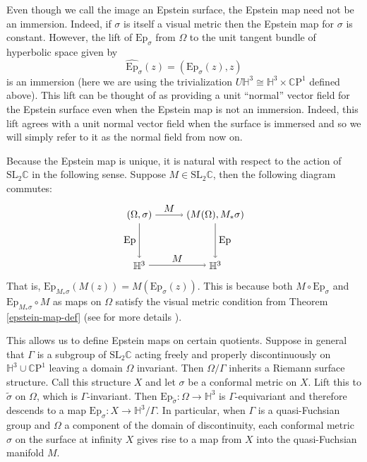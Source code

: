 \documentclass{amsart}
\newcommand{\C}{\mathbb{C}}
\newcommand{\CP}{\mathbb{C}\mathrm{P}}
\renewcommand{\H}{\mathbb{H}}
\begin{document}
 

Even though we call the image an Epstein surface, the Epstein map need not be an immersion. 
Indeed, if $\sigma$ is itself a visual metric then the Epstein map for $\sigma$ is constant. 
However, the lift of $\mathrm{Ep}_\sigma$ from $\Omega$ to the unit tangent bundle of hyperbolic space given by 
\[
\widehat{\mathrm{Ep}}_\sigma(z) = (\text{Ep}_\sigma(z),z) 
\] 
is an immersion (here we are using the trivialization $U\H^3 \cong \H^3 \times \CP^1$ defined above). 
This lift can be thought of as providing a unit ``normal'' vector field for the Epstein surface even when the Epstein map is not an immersion. 
Indeed, this lift agrees with a unit normal vector field when the surface is immersed and so we will simply refer to it as the normal field from now on. 

Because the Epstein map is unique, it is natural with respect to the action of $\mathrm{SL}_2\C$ in the following sense. 
Suppose $M \in \mathrm{SL}_2\C$, then the following diagram commutes:
\[
\begin{tikzpicture}[scale=0.9]
\node (1) at (0,2) {$(\Omega,\sigma)$};
\node (2) at (3,2) {$(M(\Omega),M_*\sigma)$};
\node (3) at (0,0) {$\H^3$};
\node (4) at (3,0) {$\H^3$};


\draw[->] (1) to node [above] {$M$} (2);
\draw[->] (1) to node [left] {$\mathrm{Ep}$} (3);
\draw[->] (3) to node [above] {$M$} (4);
\draw[->] (2) to node [right] {$\mathrm{Ep}$} (4);

\end{tikzpicture}
\]
That is, $\mathrm{Ep}_{M_*\sigma}(M(z)) = M( \mathrm{Ep}_{\sigma}(z))$. 
This is because both $M \circ \mathrm{Ep}_\sigma$ and $\mathrm{Ep}_{M_*\sigma} \circ M$ as maps on $\Omega$ satisfy the visual metric condition from Theorem \ref{epstein-map-def} (see \cite{anderson1998} for more details ).

This allows us to define Epstein maps on certain quotients. 
Suppose in general that $\Gamma$ is a subgroup of $\mathrm{SL}_2\C$ acting freely and properly discontinuously on $\H^3 \cup \CP^1$ leaving a domain $\Omega$ invariant. 
Then $\Omega/\Gamma$ inherits a Riemann surface structure. 
Call this structure $X$ and let $\sigma$ be a conformal metric  on $X$.
Lift this to $\tilde{\sigma}$ on $\Omega$, which is $\Gamma$-invariant. 
Then $\mathrm{Ep}_{\tilde{\sigma}}: \Omega \to \H^3$ is $\Gamma$-equivariant and therefore descends to a map $\mathrm{Ep}_\sigma : X \to \H^3/ \Gamma$. 
In particular, when $\Gamma$ is a quasi-Fuchsian group and $\Omega$ a component of the domain of discontinuity, each conformal metric $\sigma$ on the surface at infinity $X$ gives rise to a map from $X$ into the quasi-Fuchsian manifold $M$.
\end{document}
